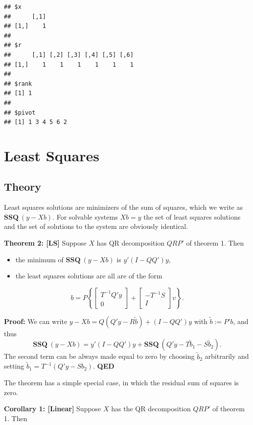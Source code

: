 \documentclass[12pt,]{article}
\providecommand{\tightlist}{%
  \setlength{\itemsep}{0pt}\setlength{\parskip}{0pt}}
\begin{document}
\begin{verbatim}
## $x
##      [,1]
## [1,]    1
## 
## $r
##      [,1] [,2] [,3] [,4] [,5] [,6]
## [1,]    1    1    1    1    1    1
## 
## $rank
## [1] 1
## 
## $pivot
## [1] 1 3 4 5 6 2
\end{verbatim}

\section{Least Squares}\label{least-squares}

\subsection{Theory}\label{theory-1}

Least squares solutions are minimizers of the sum of squares, which we
write as \(\mathbf{SSQ}\ (y-Xb)\). For solvable systems \(Xb=y\) the set
of least squares solutions and the set of solutions to the system are
obviously identical.

\textbf{Theorem 2: {[}LS{]}} Suppose \(X\) has QR decomposition \(QRP'\)
of theorem 1. Then

\begin{itemize}
\tightlist
\item
  the minimum of \(\mathbf{SSQ}\ (y- Xb)\) is \(y'(I-QQ')y\),
\item
  the least squares solutions are all are of the form
\end{itemize}

\begin{equation}
b = P\left\{\begin{bmatrix}T^{-1}Q'y\\0\end{bmatrix}+\begin{bmatrix}-T^{-1}S\\I\end{bmatrix}v\right\}.\label{E:ls}
\end{equation}

\textbf{Proof:} We can write \(y-Xb=Q(Q'y-R\tilde b)+(I-QQ')y\) with
\(\tilde b:=P'b\), and thus \[
\mathbf{SSQ}\ (y-Xb)=y'(I-QQ')y+\mathbf{SSQ}\ (Q'y - T\tilde b_1 - S\tilde b_2).
\] The second term can be always made equal to zero by choosing
\(\tilde b_2\) arbitrarily and setting \(\tilde b_1=T^{-1}(Q'y-Sb_2)\).
\textbf{QED}

The theorem has a simple special case, in which the residual sum of
squares is zero.

\textbf{Corollary 1: {[}Linear{]}} Suppose \(X\) has the QR
decomposition \(QRP'\) of theorem 1. Then
\end{document}
